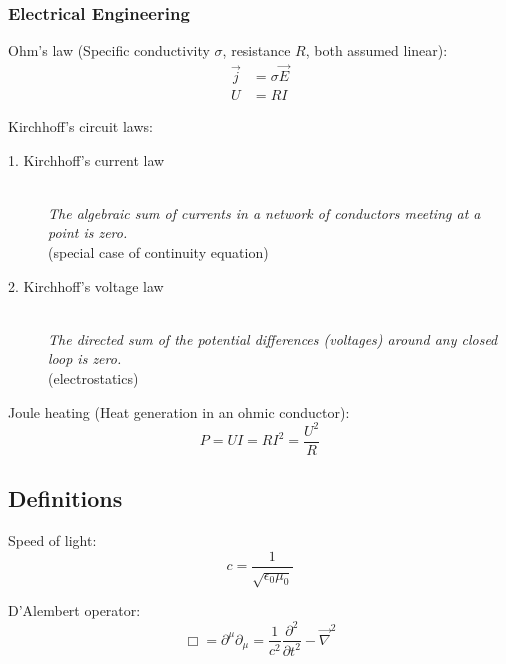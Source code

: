 		\subsubsection{Electrical Engineering}
			\noindent
			Ohm's law (Specific conductivity $\sigma$, resistance $R$, both assumed linear):
			\begin{equation}
				\begin{aligned}
					\vec{j} &= \sigma\vec{E} \\
					U &= R I
				\end{aligned}
			\end{equation}

			\noindent
			Kirchhoff's circuit laws:
			\begin{description}
				\item[1. Kirchhoff's current law] \hfill \\
					{\textit{The algebraic sum of currents in a network of conductors meeting at a point is zero.} \\(special case of continuity equation)}
				\item[2. Kirchhoff's voltage law] \hfill \\
					{\textit{The directed sum of the potential differences (voltages) around any closed loop is zero.} \\(electrostatics)}
			\end{description}

			\noindent
			Joule heating (Heat generation in an ohmic conductor):
			\begin{equation}
				P = UI = RI^2 = \frac{U^2}{R}
			\end{equation}



	\subsection{Definitions}
		\noindent
		Speed of light:
		\begin{equation}
			c=\frac{1}{\sqrt{\epsilon_0 \mu_0}}
		\end{equation}

		\noindent
		D'Alembert operator:
		\begin{equation}
			\Box = \partial^\mu \partial_\mu = \frac{1}{c^2}\frac{\partial^2}{\partial t^2} - \vec{\nabla}^2
		\end{equation}

